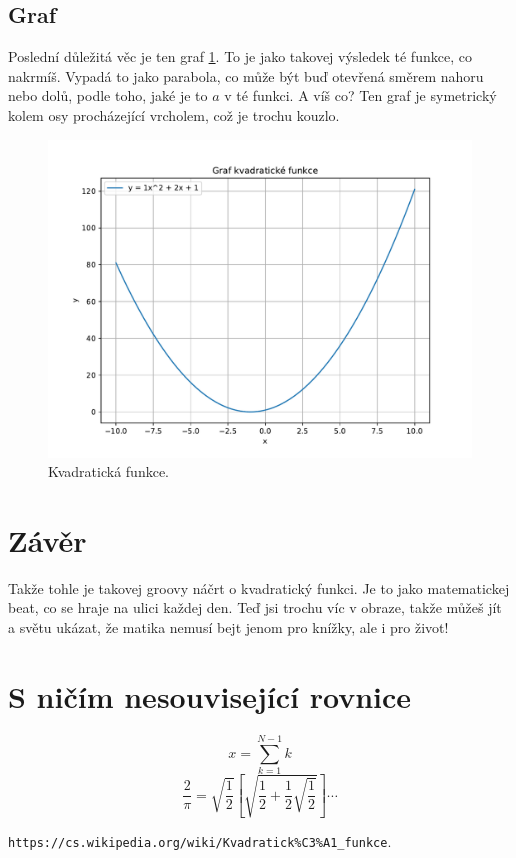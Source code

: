 \documentclass[a4paper,12pt]{article}
\begin{document}
\subsection{Graf}
Poslední důležitá věc je ten graf \ref{fig:kvadratickafunkce}.
To je jako takovej výsledek té funkce, co nakrmíš. 
Vypadá to jako parabola, co může být buď otevřená směrem nahoru nebo dolů, podle toho, jaké je to $a$ v té funkci. 
A víš co? 
Ten graf je symetrický kolem osy procházející vrcholem, což je trochu kouzlo.

\begin{figure}[!hp]
	\centering
	\includegraphics[width=0.8\linewidth]{graf.pdf}
	\caption{Kvadratická funkce.}
	\label{fig:kvadratickafunkce}
\end{figure}

\section{Závěr}
Takže tohle je takovej groovy náčrt o kvadratický funkci. 
Je to jako matematickej beat, co se hraje na ulici každej den. 
Teď jsi trochu víc v obraze, takže můžeš jít a světu ukázat, že matika nemusí bejt jenom pro knížky, ale i pro život!

\appendix
\section{S ničím nesouvisející rovnice}
\begin{equation}
	x=\sum_{k=1}^{N-1}k
\end{equation}
\begin{equation}
	\frac{2}{\pi}=\sqrt{\frac{1}{2}}\left[\sqrt{\frac{1}{2}+\frac{1}{2}\sqrt{\frac{1}{2}}}\right]\dotsb
\end{equation}

\begin{thebibliography}{99}
 \verb+https://cs.wikipedia.org/wiki/Kvadratick%C3%A1_funkce+.
\end{thebibliography}

\tableofcontents
\end{document}

